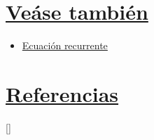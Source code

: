 \documentclass{article}
\begin{document}
	\section[Veáse también]{\hyperlink{toc}{Veáse también}}
	\begin{itemize}[label={$\bullet$}]
		\item \href{https://es.wikipedia.org/wiki/Ecuación_recurrente}{Ecuación recurrente}
	\end{itemize}
	\section[Referencias]{\hyperlink{toc}{Referencias}}
	[\refname]{} %
	\printbibliography
\end{document}
